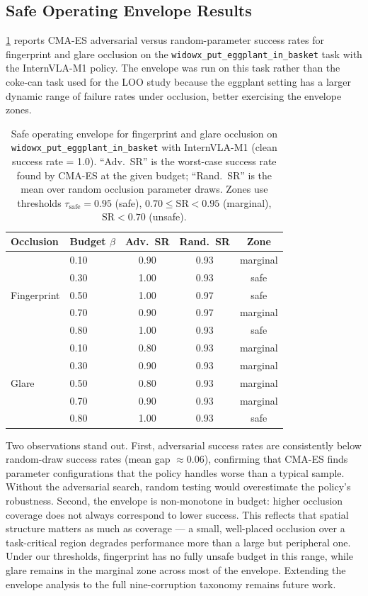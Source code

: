 \documentclass[letterpaper]{IEEEtran}
\begin{document}
\subsection{Safe Operating Envelope Results}
\label{sec:envelope_results}

\cref{tab:envelope} reports CMA-ES adversarial versus random-parameter success rates for fingerprint and glare occlusion on the \texttt{widowx\_put\_eggplant\_in\_basket} task with the InternVLA-M1 policy.
The envelope was run on this task rather than the coke-can task used for the LOO study because the eggplant setting has a larger dynamic range of failure rates under occlusion, better exercising the envelope zones.

\begin{table}[t]
\centering
\caption{Safe operating envelope for fingerprint and glare occlusion on \texttt{widowx\_put\_eggplant\_in\_basket} with InternVLA-M1 (clean success rate = 1.0). ``Adv.\ SR'' is the worst-case success rate found by CMA-ES at the given budget; ``Rand.\ SR'' is the mean over random occlusion parameter draws. Zones use thresholds $\tau_{\text{safe}}=0.95$ (safe), $0.70 \leq \text{SR} < 0.95$ (marginal), $\text{SR} < 0.70$ (unsafe).}
\label{tab:envelope}
\begin{tabular}{llccc}
\toprule
\textbf{Occlusion} & \textbf{Budget $\beta$} & \textbf{Adv.\ SR} & \textbf{Rand.\ SR} & \textbf{Zone} \\
\midrule
\multirow{5}{*}{Fingerprint}
  & 0.10 & 0.90 & 0.93 & marginal \\
  & 0.30 & 1.00 & 0.93 & safe \\
  & 0.50 & 1.00 & 0.97 & safe \\
  & 0.70 & 0.90 & 0.97 & marginal \\
  & 0.80 & 1.00 & 0.93 & safe \\
\midrule
\multirow{5}{*}{Glare}
  & 0.10 & 0.80 & 0.93 & marginal \\
  & 0.30 & 0.90 & 0.93 & marginal \\
  & 0.50 & 0.80 & 0.93 & marginal \\
  & 0.70 & 0.90 & 0.93 & marginal \\
  & 0.80 & 1.00 & 0.93 & safe \\
\bottomrule
\end{tabular}
\end{table}

Two observations stand out.
First, adversarial success rates are consistently below random-draw success rates (mean gap ${\approx}0.06$), confirming that CMA-ES finds parameter configurations that the policy handles worse than a typical sample. Without the adversarial search, random testing would overestimate the policy's robustness.
Second, the envelope is non-monotone in budget: higher occlusion coverage does not always correspond to lower success. This reflects that spatial structure matters as much as coverage --- a small, well-placed occlusion over a task-critical region degrades performance more than a large but peripheral one.
Under our thresholds, fingerprint has no fully unsafe budget in this range, while glare remains in the marginal zone across most of the envelope.
Extending the envelope analysis to the full nine-corruption taxonomy remains future work.
\end{document}

